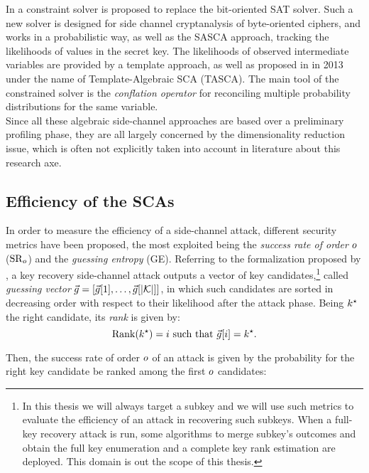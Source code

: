 In \cite{Oren2014} a constraint solver is proposed to replace the bit-oriented SAT solver. Such a new solver is designed for side channel cryptanalysis of byte-oriented ciphers, and works in a probabilistic way, as well as the SASCA approach, tracking the likelihoods of values in the secret key. The likelihoods of observed intermediate variables are provided by a template approach, as well as proposed in \cite{Oren:2013} in 2013 under the name of Template-Algebraic SCA (TASCA). The main tool  of the constrained solver is the \emph{conflation operator} for reconciling multiple probability distributions for the same variable.\\

Since all these algebraic side-channel approaches are based over a preliminary profiling phase, they are all largely concerned by the dimensionality reduction issue, which is often not explicitly taken into account in literature about this research axe. 

\subsection{Efficiency of the SCAs}\label{sec:metrics}
In order to measure the efficiency of a side-channel attack, different security metrics have been proposed, the most exploited being the \emph{success rate of order} $o$ ($\mathrm{SR}_o$) and the \emph{guessing entropy} (GE). Referring to the formalization proposed by \cite{unifiedFramework}, a key recovery side-channel attack outputs a vector of key candidates,\footnote{In this thesis we will always target a subkey and we will use such metrics to evaluate the efficiency of an attack in recovering such subkeys. When a full-key recovery attack is run, some algorithms to merge subkey's outcomes and obtain the full key enumeration and a complete key rank estimation are deployed. This domain is out the scope of this thesis.} called {\em guessing vector} $\vec{g} = \left[\vec{g}[1], \dots, \vec{g}[{\lvert \mathcal{K} \rvert}]\right]$, in which such candidates are sorted in decreasing order with respect to their likelihood after the attack phase. Being $k^\star$ the right candidate, its \emph{rank} is given by:
\begin{equation}
\mathrm{Rank}(k^\star) = i \mbox{ such that } \vec{g}[i] = k^\star \mbox{.}
\end{equation}

Then, the success rate of order $o$ of an attack is given by the probability for the right key candidate be ranked among the first $o$ candidates: 

